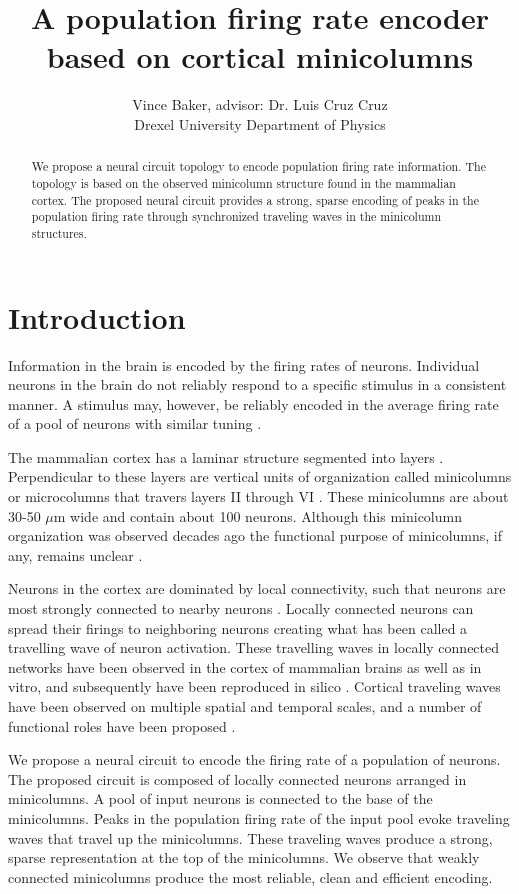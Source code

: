 \documentclass[a4paper,11pt]{article}
\title{A population firing rate encoder based on cortical minicolumns}
\author{Vince Baker, advisor: Dr. Luis Cruz Cruz\\ Drexel University Department of Physics}
\begin{document}
\maketitle

\begin{abstract}
We propose a neural circuit topology to encode population firing rate information.
The topology is based on the observed minicolumn structure found in the mammalian cortex.
The proposed neural circuit provides a strong, sparse encoding of peaks in the population firing rate through synchronized traveling waves in the minicolumn structures.
\end{abstract}

\section{Introduction} 
Information in the brain is encoded by the firing rates of neurons.
Individual neurons in the brain do not reliably respond to a specific stimulus in a consistent manner.
A stimulus may, however, be reliably encoded in the average firing rate of a pool of neurons with similar tuning \cite{trappenberg}.

The mammalian cortex has a laminar structure segmented into layers \cite{banich}.
Perpendicular to these layers are vertical units of organization called minicolumns or microcolumns that travers layers II through VI \cite{buxhoeveden2002}\cite{cruz2005}.
These minicolumns are about 30-50 $\mu$m wide and contain about 100 neurons.
Although this minicolumn organization was observed decades ago the functional purpose of minicolumns, if any, remains unclear \cite{horton2005}.

Neurons in the cortex are dominated by local connectivity, such that neurons are most strongly connected to nearby neurons \cite{levy2012}.
Locally connected neurons can spread their firings to neighboring neurons creating what has been called a travelling wave of neuron activation. 
These travelling waves in locally connected networks have been observed in the cortex of mammalian brains as well as in vitro, and subsequently have been reproduced in silico \cite{keane2015}\cite{ermentrout2001}\cite{wu2008}.
Cortical traveling waves have been observed on multiple spatial and temporal scales, and a number of functional roles have been proposed \cite{muller2018}.

We propose a neural circuit to encode the firing rate of a population of neurons.
The proposed circuit is composed of locally connected neurons arranged in minicolumns.
A pool of input neurons is connected to the base of the minicolumns.
Peaks in the population firing rate of the input pool evoke traveling waves that travel up the minicolumns.
These traveling waves produce a strong, sparse representation at the top of the minicolumns.
We observe that weakly connected minicolumns produce the most reliable, clean and efficient encoding.
\end{document}
